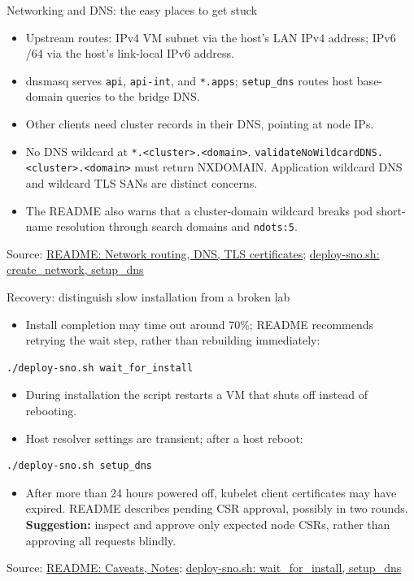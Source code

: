 \documentclass[aspectratio=169,11pt]{beamer}
\newcommand{\reposource}[1]{\par\vfill{\tiny Source: #1\par}}
\newcommand{\readmeref}[1]{\href{https://github.com/matejvasek/mycluster/blob/master/README.md}{README: #1}}
\newcommand{\scriptref}[1]{\href{https://github.com/matejvasek/mycluster/blob/master/deploy-sno.sh}{deploy-sno.sh: #1}}
\begin{document}
\begin{frame}{Networking and DNS: the easy places to get stuck}
  \begin{itemize}
    \item Upstream routes: IPv4 VM subnet via the host's LAN IPv4 address;
      IPv6 /64 via the host's link-local IPv6 address.
    \item dnsmasq serves \texttt{api}, \texttt{api-int}, and \texttt{*.apps};
      \texttt{setup\_dns} routes host base-domain queries to the bridge DNS.
    \item Other clients need cluster records in their DNS, pointing at node IPs.
    \item \alert{No DNS wildcard at \texttt{*.<cluster>.<domain>}.}
      \texttt{validateNoWildcardDNS.<cluster>.<domain>} must return NXDOMAIN.
      Application wildcard DNS and wildcard TLS SANs are distinct concerns.
    \item The README also warns that a cluster-domain wildcard breaks pod
      short-name resolution through search domains and \texttt{ndots:5}.
  \end{itemize}
  \reposource{\readmeref{Network routing, DNS, TLS certificates}; \scriptref{create\_network, setup\_dns}}
\end{frame}

\begin{frame}[fragile]{Recovery: distinguish slow installation from a broken lab}
  \begin{itemize}
    \item Install completion may time out around 70\%; README recommends
      retrying the wait step, rather than rebuilding immediately:
  \end{itemize}
\begin{verbatim}
./deploy-sno.sh wait_for_install
\end{verbatim}
  \begin{itemize}
    \item During installation the script restarts a VM that shuts off
      instead of rebooting.
    \item Host resolver settings are transient; after a host reboot:
  \end{itemize}
\begin{verbatim}
./deploy-sno.sh setup_dns
\end{verbatim}
  \begin{itemize}
    \item After more than 24 hours powered off, kubelet client certificates
      may have expired. README describes pending CSR approval, possibly
      in two rounds. \textbf{Suggestion:} inspect and approve only expected
      node CSRs, rather than approving all requests blindly.
  \end{itemize}
  \reposource{\readmeref{Caveats, Notes}; \scriptref{wait\_for\_install, setup\_dns}}
\end{frame}
\end{document}
